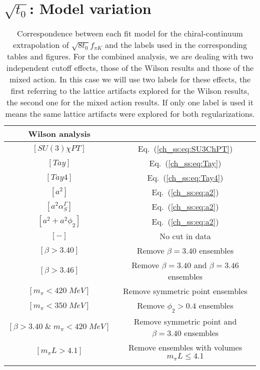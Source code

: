 
\chapter{$\sqrt{t_0}$: Model variation}
\label{apex_model_av_t0}


\begin{longtable}{ c | c}
Wilson analysis \\
\toprule
$[SU(3)\chi PT]$ & Eq.~(\ref{ch_ss:eq:SU3ChPT}) \\
$[Tay]$ & Eq.~(\ref{ch_ss:eq:Tay}) \\
$[Tay4]$ & Eq.~(\ref{ch_ss:eq:Tay4}) \\
\midrule
$[a^2]$ & Eq.~(\ref{ch_ss:eq:a2}) \\
$[a^2\alpha_S^{\Gamma}]$ & Eq.~(\ref{ch_ss:eq:a2}) \\
$[a^2+a^2\phi_2]$ & Eq.~(\ref{ch_ss:eq:a2}) \\
\midrule
$[-]$ & No cut in data \\
$[\beta>3.40]$ & Remove $\beta=3.40$ ensembles \\
$[\beta>3.46]$ & Remove $\beta=3.40$ and $\beta=3.46$ ensembles \\
$[m_{\pi}<420\;MeV]$ & Remove symmetric point ensembles \\
$[m_{\pi}<350\;MeV]$ & Remove $\phi_2>0.4$ ensembles \\
$[\beta>3.40\;\&\;m_{\pi}<420\;MeV]$ & Remove symmetric point and $\beta=3.40$ ensembles \\
$[m_{\pi}L>4.1]$ & Remove ensembles with volumes $m_{\pi}L\leq4.1$ \\
\bottomrule
\caption{Correspondence between each fit model for the chiral-continuum extrapolation of $\sqrt{8t_0}f_{\pi K}$ and the labels used in the corresponding tables and figures. For the combined analysis, we are dealing with two independent cutoff effects, those of the Wilson results and those of the mixed action. In this case we will use two labels for these effects, the first referring to the lattice artifacts explored for the Wilson results, the second one for the mixed action results. If only one label is used it means the same lattice artifacts were explored for both regularizations.}
\end{longtable}

